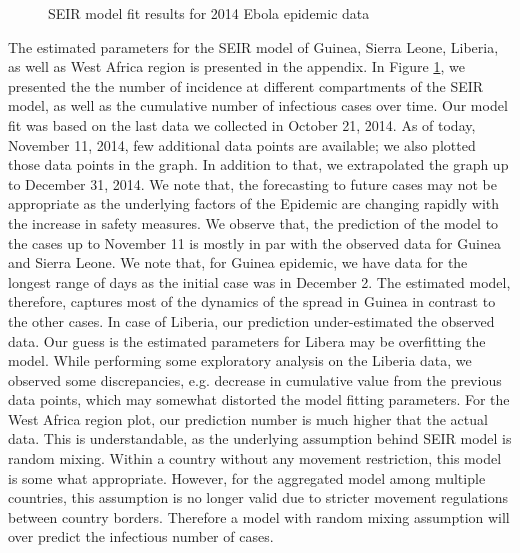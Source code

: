 \documentclass[10pt, journal,onecolumn]{IEEEtran}
\begin{document}
\begin{figure}[ht]
{  \label{fig:subfigure3}}
\quad
{}

\caption{SEIR model fit results for 2014 Ebola epidemic data}
\label{Fig:figurePrediction}
\end{figure}


The estimated parameters for the SEIR model of Guinea, Sierra Leone, Liberia, as well as West Africa region is presented in the appendix. In Figure \ref{Fig:figurePrediction}, we presented the the number of incidence at different compartments of the SEIR model, as well as the cumulative number of infectious cases over time. Our model fit was based on the last data we collected in October 21, 2014. As of today, November 11, 2014, few additional data points are available; we also plotted those data points in the graph. In addition to that, we extrapolated the graph up to December 31, 2014. We note that, the forecasting to future cases may not be appropriate as the underlying factors of the Epidemic are changing rapidly with the increase in safety measures. We observe that, the prediction of the model to the cases up to November 11 is mostly in par with the observed data for Guinea and Sierra Leone. We note that, for Guinea epidemic, we have data for the longest range of days as the initial case was in December 2. The estimated model, therefore, captures most of the dynamics of the spread in Guinea in contrast to the other cases. In case of Liberia, our prediction under-estimated the observed data. Our guess is the estimated parameters for Libera may be overfitting the model. While performing some exploratory analysis on the Liberia data, we observed some discrepancies, e.g. decrease in cumulative value from the previous data points, which may somewhat distorted the model fitting parameters. For the West Africa region plot, our prediction number is much higher that the actual data. This is understandable, as the underlying assumption behind SEIR model is random mixing.  Within a country without any movement restriction, this model is some what appropriate. However, for the aggregated model among multiple countries, this assumption is no longer valid due to stricter movement regulations between country borders. Therefore a model with random mixing assumption will over predict the infectious number of cases.
\end{document}
